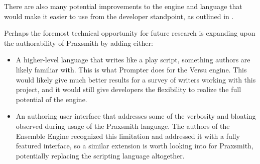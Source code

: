 There are also many potential improvements to the engine and language that would
make it easier to use from the developer standpoint, as outlined in .

Perhaps the foremost technical opportunity for future research is expanding upon the
authorability of Praxsmith by adding either:

\begin{itemize}
    \item A higher-level language that writes like a play script, something
    authors are likely familiar with. This is what Prompter does for the Versu engine.
    \cite{nelson_prompter_2014} This would likely give much better results for a
    survey of writers working with this project, and it would still give developers
    the flexibility to realize the full potential of the engine.
    \item An authoring user interface that addresses some of the verbosity and
    bloating observed during usage of the Praxsmith language. The authors of the
    Ensemble Engine recognized this limitation and addressed it with a fully featured
    interface, \cite{samuel_ensemble_2015} so a similar extension is worth looking
    into for Praxsmith, potentially replacing the scripting language altogether.
\end{itemize}
